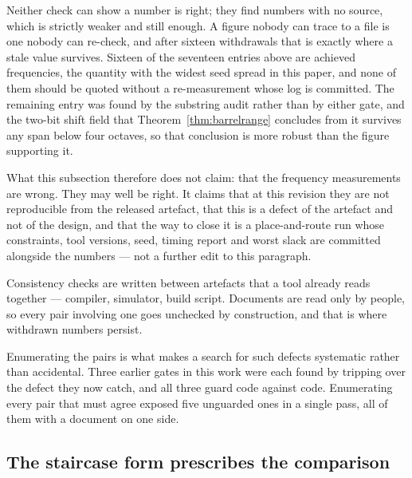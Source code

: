 Neither check can show a number is right; they find numbers with no source, which
is strictly weaker and still enough. A figure nobody can trace to a file is one
nobody can re-check, and after sixteen withdrawals that is exactly where a stale
value survives. Sixteen of the seventeen entries above are achieved frequencies,
the quantity with the widest seed spread in this paper, and none of them should be
quoted without a re-measurement whose log is committed. The remaining entry was
found by the substring audit rather than by either gate, and the two-bit shift
field that Theorem~\ref{thm:barrelrange} concludes from it survives any span below
four octaves, so that conclusion is more robust than the figure supporting it.

What this subsection therefore does not claim: that the frequency measurements are
wrong. They may well be right. It claims that at this revision they are not
reproducible from the released artefact, that this is a defect of the artefact and
not of the design, and that the way to close it is a place-and-route run whose
constraints, tool versions, seed, timing report and worst slack are committed
alongside the numbers --- not a further edit to this paragraph.

\begin{theorem}
\label{thm:doctrace}
Consistency checks are written between artefacts that a tool already reads
together --- compiler, simulator, build script. Documents are read only by
people, so every pair involving one goes unchecked by construction, and that is
where withdrawn numbers persist.
\end{theorem}

Enumerating the pairs is what makes a search for such defects systematic rather
than accidental. Three earlier gates in this work were each found by tripping
over the defect they now catch, and all three guard code against code.
Enumerating every pair that must agree exposed five unguarded ones in a single
pass, all of them with a document on one side.



\subsection{The staircase form prescribes the comparison}

